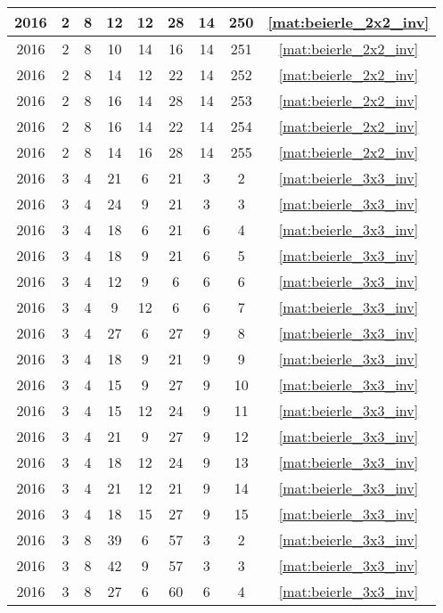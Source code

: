 \begin{longtable}{|c|c|c|c|c|c|c|c|c|}
2016 & 2 & 8 & 12 & 12 & 28 & 14 & 250 & \eqref{mat:beierle_2x2_inv} \\ \hline 
2016 & 2 & 8 & 10 & 14 & 16 & 14 & 251 & \eqref{mat:beierle_2x2_inv} \\ \hline 
2016 & 2 & 8 & 14 & 12 & 22 & 14 & 252 & \eqref{mat:beierle_2x2_inv} \\ \hline 
2016 & 2 & 8 & 16 & 14 & 28 & 14 & 253 & \eqref{mat:beierle_2x2_inv} \\ \hline 
2016 & 2 & 8 & 16 & 14 & 22 & 14 & 254 & \eqref{mat:beierle_2x2_inv} \\ \hline 
2016 & 2 & 8 & 14 & 16 & 28 & 14 & 255 & \eqref{mat:beierle_2x2_inv} \\ \hline 
2016 & 3 & 4 & 21 & 6 & 21 & 3 & 2 & \eqref{mat:beierle_3x3_inv} \\ \hline 
2016 & 3 & 4 & 24 & 9 & 21 & 3 & 3 & \eqref{mat:beierle_3x3_inv} \\ \hline 
2016 & 3 & 4 & 18 & 6 & 21 & 6 & 4 & \eqref{mat:beierle_3x3_inv} \\ \hline 
2016 & 3 & 4 & 18 & 9 & 21 & 6 & 5 & \eqref{mat:beierle_3x3_inv} \\ \hline 
2016 & 3 & 4 & 12 & 9 & 6 & 6 & 6 & \eqref{mat:beierle_3x3_inv} \\ \hline 
2016 & 3 & 4 & 9 & 12 & 6 & 6 & 7 & \eqref{mat:beierle_3x3_inv} \\ \hline 
2016 & 3 & 4 & 27 & 6 & 27 & 9 & 8 & \eqref{mat:beierle_3x3_inv} \\ \hline 
2016 & 3 & 4 & 18 & 9 & 21 & 9 & 9 & \eqref{mat:beierle_3x3_inv} \\ \hline 
2016 & 3 & 4 & 15 & 9 & 27 & 9 & 10 & \eqref{mat:beierle_3x3_inv} \\ \hline 
2016 & 3 & 4 & 15 & 12 & 24 & 9 & 11 & \eqref{mat:beierle_3x3_inv} \\ \hline 
2016 & 3 & 4 & 21 & 9 & 27 & 9 & 12 & \eqref{mat:beierle_3x3_inv} \\ \hline 
2016 & 3 & 4 & 18 & 12 & 24 & 9 & 13 & \eqref{mat:beierle_3x3_inv} \\ \hline 
2016 & 3 & 4 & 21 & 12 & 21 & 9 & 14 & \eqref{mat:beierle_3x3_inv} \\ \hline 
2016 & 3 & 4 & 18 & 15 & 27 & 9 & 15 & \eqref{mat:beierle_3x3_inv} \\ \hline 
2016 & 3 & 8 & 39 & 6 & 57 & 3 & 2 & \eqref{mat:beierle_3x3_inv} \\ \hline 
2016 & 3 & 8 & 42 & 9 & 57 & 3 & 3 & \eqref{mat:beierle_3x3_inv} \\ \hline 
2016 & 3 & 8 & 27 & 6 & 60 & 6 & 4 & \eqref{mat:beierle_3x3_inv} \\ \hline 

\end{longtable}
